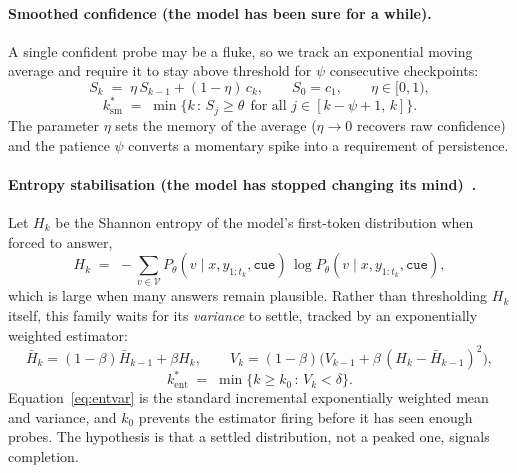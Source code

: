 \documentclass[acmsmall]{acmart}
\theoremstyle{acmdefinition}%
\theoremstyle{acmplain}}{}%
\begin{document}
\paragraph{Smoothed confidence (the model has been sure for a while).}
A single confident probe may be a fluke, so we track an exponential moving average and require it to stay above threshold for $\psi$ consecutive checkpoints:
\begin{equation}
S_k \;=\; \eta\,S_{k-1} + (1-\eta)\,c_k, \qquad S_0 = c_1, \qquad \eta \in [0,1),
\label{eq:ema}
\end{equation}
\begin{equation}
k^\ast_{\mathrm{sm}} \;=\; \min\big\{k \,:\, S_j \geq \theta \ \ \text{for all } j \in [k-\psi+1,\,k]\big\}.
\label{eq:smooth}
\end{equation}
The parameter $\eta$ sets the memory of the average ($\eta\to0$ recovers raw confidence) and the patience $\psi$ converts a momentary spike into a requirement of persistence.

\paragraph{Entropy stabilisation (the model has stopped changing its mind)~\cite{wang2025eat}.}
Let $H_k$ be the Shannon entropy of the model's first-token distribution when forced to answer,
\begin{equation}
H_k \;=\; -\sum_{v \in \mathcal{V}} P_\theta(v \mid x, y_{1:t_k}, \texttt{cue}) \, \log P_\theta(v \mid x, y_{1:t_k}, \texttt{cue}),
\label{eq:entropydef}
\end{equation}
which is large when many answers remain plausible. Rather than thresholding $H_k$ itself, this family waits for its \emph{variance} to settle, tracked by an exponentially weighted estimator:
\begin{equation}
\bar H_k = (1-\beta)\bar H_{k-1} + \beta H_k, \qquad
V_k = (1-\beta)\big(V_{k-1} + \beta\,(H_k - \bar H_{k-1})^2\big),
\label{eq:entvar}
\end{equation}
\begin{equation}
k^\ast_{\mathrm{ent}} \;=\; \min\{k \geq k_0 \,:\, V_k < \delta\}.
\label{eq:entropy}
\end{equation}
Equation~\eqref{eq:entvar} is the standard incremental exponentially weighted mean and variance, and $k_0$ prevents the estimator firing before it has seen enough probes. The hypothesis is that a settled distribution, not a peaked one, signals completion.
\end{document}
